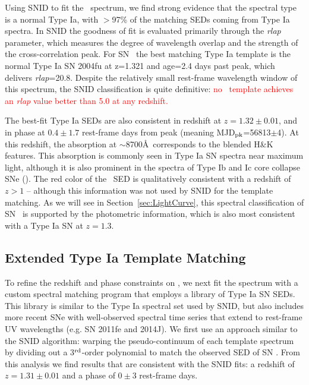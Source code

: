 Using SNID to fit the \tomas\ spectrum, we find strong evidence that
the spectral type is a normal Type Ia, with $>$97\% of the matching
SEDs coming from Type Ia spectra.  
In SNID the goodness of fit is evaluated primarily through the {\it rlap} parameter, which measures the degree of wavelength overlap and the strength of the cross-correlation peak.  For SN \tomas\ the best matching Type Ia template is the normal Type Ia SN 2004fu at z=1.321 and age=2.4 days past peak, which delivers {\it rlap}=20.8.
Despite the relatively small rest-frame wavelength window of this spectrum, the SNID classification is quite definitive: \textcolor{red}{no \CCSN\ template achieves an {\it rlap} value better than 5.0 at any redshift.}

The best-fit Type Ia SEDs are also
consistent in redshift at $z=1.32\pm0.01$, and in phase at $0.4\pm1.7$
rest-frame days from peak (meaning MJD$_{\rm pk}$=56813$\pm$4).  At
this redshift, the absorption at $\sim$8700\AA\ corresponds to the
blended  H\&K features.  This  absorption is
commonly seen in Type Ia SN spectra near maximum light, although it is
also prominent in the spectra of Type Ib and Ic core collapse SNe
(\CCSNe).  The red color of the \tomas\ SED is qualitatively
consistent with a redshift of $z>1$ -- although this information was
not used by SNID for the template matching.  As we will see in
Section~\ref{sec:LightCurve}, this spectral classification of
SN \tomas\ is supported by the photometric information, which is also
most consistent with a Type Ia SN at $z=1.3$.


\subsection{Extended Type Ia Template Matching}
\label{sec:FittingWithAdditionalTypeIaTemplates}

To refine the redshift and phase constraints on \tomas, we next fit
the spectrum with a custom spectral matching program that employs a
library of Type Ia SN SEDs.  This library is similar to the Type Ia
spectral set used by SNID, but also includes more recent SNe with
well-observed spectral time series that extend to rest-frame UV
wavelengths (e.g. SN 2011fe and 2014J).  We first use an approach
similar to the SNID algorithm: warping the pseudo-continuum of each
template spectrum by dividing out a 3$^{\rm rd}$-order polynomial to match the
observed SED of SN \tomas.  From this analysis we find results that
are consistent with the SNID fits: a redshift of $z=1.31\pm0.01$ and a
phase of $0\pm3$ rest-frame days.   

